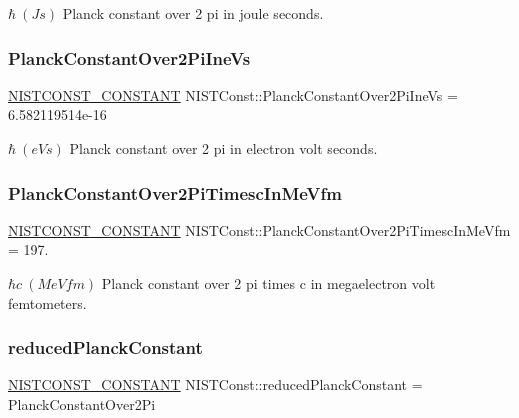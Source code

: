 $\hbar \ (J s)$ Planck constant over 2 pi in joule seconds. \mbox{\label{group___n_i_s_t_const-_planck_constant_ga1e4fdaaf00e0741e9627e4feffccd23a}} 
\subsubsection{\texorpdfstring{Planck\+Constant\+Over2\+Pi\+Ine\+Vs}{PlanckConstantOver2PiIneVs}}
{\footnotesize\ttfamily \mbox{\hyperlink{group___n_i_s_t_const-_macros_ga2b0fc1d7452373f816175dd86ce26729}{N\+I\+S\+T\+C\+O\+N\+S\+T\+\_\+\+C\+O\+N\+S\+T\+A\+NT}} N\+I\+S\+T\+Const\+::\+Planck\+Constant\+Over2\+Pi\+Ine\+Vs = 6.\+582119514e-\/16}

$\hbar \ (eV s)$ Planck constant over 2 pi in electron volt seconds. \mbox{\label{group___n_i_s_t_const-_planck_constant_ga3c5872da7678ae41641308eab4d41846}} 
\subsubsection{\texorpdfstring{Planck\+Constant\+Over2\+Pi\+Timesc\+In\+Me\+Vfm}{PlanckConstantOver2PiTimescInMeVfm}}
{\footnotesize\ttfamily \mbox{\hyperlink{group___n_i_s_t_const-_macros_ga2b0fc1d7452373f816175dd86ce26729}{N\+I\+S\+T\+C\+O\+N\+S\+T\+\_\+\+C\+O\+N\+S\+T\+A\+NT}} N\+I\+S\+T\+Const\+::\+Planck\+Constant\+Over2\+Pi\+Timesc\+In\+Me\+Vfm = 197.}

$\hbar c \ (MeV fm)$ Planck constant over 2 pi times c in megaelectron volt femtometers. \mbox{\label{group___n_i_s_t_const-_planck_constant_gab1c9a096e23274f5833a09c9c5ddbcf0}} 
\subsubsection{\texorpdfstring{reduced\+Planck\+Constant}{reducedPlanckConstant}}
{\footnotesize\ttfamily \mbox{\hyperlink{group___n_i_s_t_const-_macros_ga2b0fc1d7452373f816175dd86ce26729}{N\+I\+S\+T\+C\+O\+N\+S\+T\+\_\+\+C\+O\+N\+S\+T\+A\+NT}} N\+I\+S\+T\+Const\+::reduced\+Planck\+Constant = Planck\+Constant\+Over2\+Pi}

